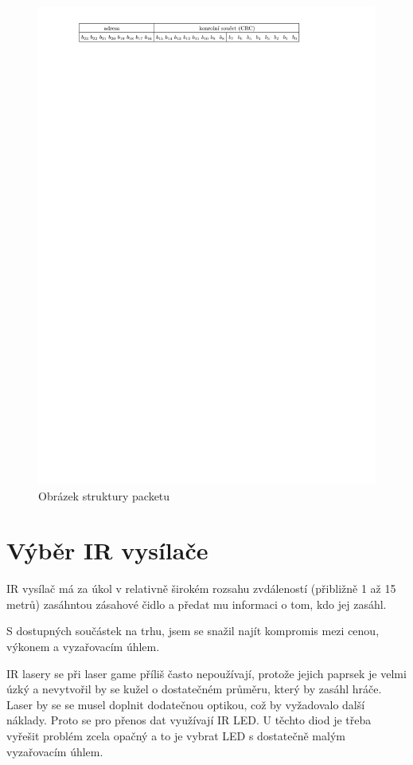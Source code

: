\begin{figure}[H]
    \begin{center}
        \includegraphics[width=\textwidth]{img/ir-packet}
    \end{center}
    \caption{Obrázek struktury packetu}
\end{figure}

\section{Výběr IR vysílače}
IR vysílač má za úkol v relativně širokém rozsahu zvdáleností (přibližně 1 až 15 metrů) zasáhntou zásahové čidlo a předat mu informaci o tom, kdo jej zasáhl.

S dostupných součástek na trhu, jsem se snažil najít kompromis mezi cenou, výkonem a vyzařovacím úhlem.

IR lasery se při laser game příliš často nepoužívají, protože jejich paprsek je velmi úzký a nevytvořil by se kužel o dostatečném průměru, který by zasáhl hráče. Laser by se se musel doplnit dodatečnou optikou, což by vyžadovalo další náklady. Proto se pro přenos dat využívají IR LED. U těchto diod je třeba vyřešit problém zcela opačný a to je vybrat LED s dostatečně malým vyzařovacím úhlem.

